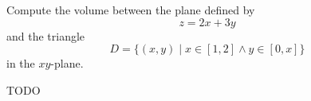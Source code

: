 \begin{exercise}
	Compute the volume between the plane defined by
	$$
		z = 2x + 3y
	$$
	and the triangle
	$$
		D = \{(x,y) \mid x \in [1,2] \wedge y \in [0,x]\}
	$$
	in the $xy$-plane.
\end{exercise}

\begin{solution}
	TODO
\end{solution}
